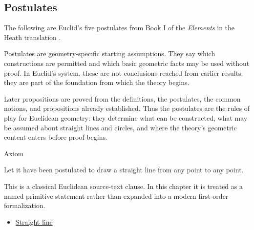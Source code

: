 \subsection*{Postulates}

\begin{remark*}
The following are Euclid's five postulates from Book I of the
\textit{Elements} in the Heath translation
\citep[Book I, Postulates 1--5]{euclid-elements-heath}.
\end{remark*}

\begin{remark*}[Exposition]
Postulates are geometry-specific starting assumptions. They say which
constructions are permitted and which basic geometric facts may be used without
proof. In Euclid's system, these are not conclusions reached from earlier
results; they are part of the foundation from which the theory begins.

Later propositions are proved from the definitions, the postulates, the common
notions, and propositions already established. Thus the postulates are the
rules of play for Euclidean geometry: they determine what can be constructed,
what may be assumed about straight lines and circles, and where the theory's
geometric content enters before proof begins.
\end{remark*}

\begin{axiombox}{Axiom}
\begin{axiom}
\label{ax:euclid-postulate-draw-straight-line}
Let it have been postulated to draw a straight line from any point to any point.
\end{axiom}
\end{axiombox}
\begin{remark*}
This is a classical Euclidean source-text clause. In this chapter it is treated
as a named primitive statement rather than expanded into a modern first-order
formalization.
\end{remark*}

\begin{lra-not-visible}
\begin{dependencies}
\begin{itemize}
  \item \hyperref[def:euclid-straight-line]{Straight line}
\end{itemize}
\end{dependencies}
\end{lra-not-visible}

